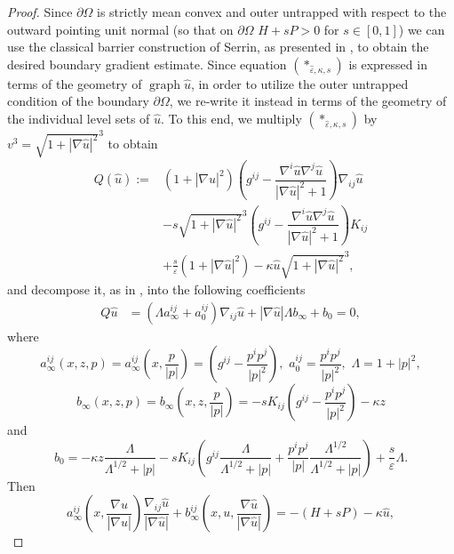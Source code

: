 \documentclass[11pt]{amsart}
\DeclareMathOperator{\graph}{graph} \DeclareMathOperator{\closure}{Closure}
\begin{document}
\begin{proof}
Since $\partial\Omega$ is strictly mean convex and outer untrapped with respect to the outward pointing unit normal (so that on $\partial \Omega$ $H+sP>0$ for $s\in[0,1]$) we can use the classical barrier construction of Serrin, as presented in   \cite[Theorem 14.6]{GT01}, to obtain the desired boundary gradient estimate. Since equation $(*_{\hat{\varepsilon},\kappa,s})$ is expressed in terms of the geometry of $\graph\hat{u}$, in order to utilize the outer untrapped condition of the boundary $\partial\Omega$, we re-write it instead in terms of the geometry of the individual level sets of $\hat{u}$. To this end, we multiply $(*_{\hat{\varepsilon},\kappa,s})$ by $v^3=\sqrt{1+|\nabla\hat{u}|^2}^3$ to obtain
\begin{align*}
Q(\hat{u}):=&
(1+|\nabla\hat{u}|^2)\left(g^{ij}-\dfrac{\nabla^i\hat{u}\nabla^j\hat{u}}{|\nabla \hat{u}|^2+1}\right)\nabla_{ij}\hat{u}\\
&-s\sqrt{1+|\nabla\hat{u}|^2}^3\left(g^{ij}-\dfrac{\nabla^i\hat{u}\nabla^j\hat{u}}{|\nabla \hat{u}|^2+1}\right)K_{ij}\\
&+\frac{s}{\varepsilon}(1+|\nabla \hat{u}|^2)-\kappa\hat{u}\sqrt{1+|\nabla \hat{u}|^2}^3,
\end{align*}
and decompose it, as in  \cite[(14.43)]{GT01}, into the following coefficients 
\begin{align}\label{levelset}
Q\hat u&=(\Lambda a^{ij}_{\infty}+a^{ij}_0)\nabla_{ij}\hat{u}+|\nabla\hat{u}|\Lambda b_{\infty}+b_0=0,
\end{align} 
where 
\[a^{ij}_{\infty}(x,z,p)=a^{ij}_{\infty}\left(x,\frac{p}{|p|}\right)=\left(g^{ij}-\frac{p^ip^j}{|p|^2}\right),\,\,a^{ij}_0=\frac{p^ip^j}{|p|^2},\,\,\Lambda=1+|p|^2,\]
\[b_{\infty}(x,z,p)=b_{\infty}\left(x,z,\frac{p}{|p|}\right)=-sK_{ij}\left(g^{ij}-\frac{p^ip^j}{|p|^2}\right)-\kappa z\]
and
\[b_0=-\kappa z\frac{\Lambda}{\Lambda^{1/2}+|p|}-sK_{ij}\left(g^{ij}\frac{\Lambda}{\Lambda^{1/2}+|p|}+\frac{p^ip^j}{|p|}\frac{\Lambda^{1/2}}{\Lambda^{1/2}+|p|}\right)+\frac{s}{\varepsilon}\Lambda.\]
Then
\begin{equation*}a^{ij}_{\infty}\left(x,\frac{\nabla\hat{u}}{|\nabla\hat{u}|}\right)\frac{\nabla_{ij}\hat{u}}{|\nabla\hat{u}|}+b^{ij}_{\infty}\left(x,u,\frac{\nabla\hat{u}}{|\nabla\hat{u}|}\right)=-(H+sP)-\kappa \hat{u}, 
\end{equation*}

\end{proof}
\end{document}
